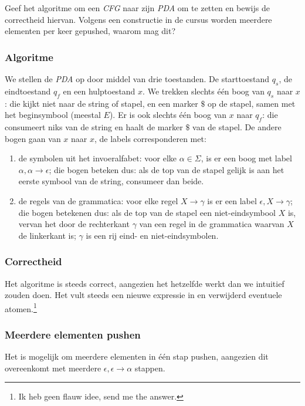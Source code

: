 \begin{question}
Geef het algoritme om een \emph{CFG} naar zijn \emph{PDA} om te zetten en bewijs de correctheid hiervan.
Volgens een constructie in de cursus worden meerdere elementen per keer gepushed, waarom mag dit?
\end{question}

\subsubsection*{Algoritme}

We stellen de \emph{PDA} op door middel van drie toestanden. De starttoestand $q_s$, de eindtoestand $q_f$ en een hulptoestand $x$. We trekken slechts \'e\'en boog van $q_s$ naar $x$: die kijkt niet naar de string of stapel, en een marker $\$$ op de stapel, samen met het beginsymbool (meestal $E$). Er is ook slechts \'e\'en boog van $x$ naar $q_f$: die consumeert niks van de string en haalt de marker $\$$ van de stapel. De andere bogen gaan van $x$ naar $x$, de labels corresponderen met:
\begin{enumerate}
	\item de symbolen uit het invoeralfabet: voor elke $\alpha \in \Sigma$, is er een boog met label $\alpha, \alpha \rightarrow \epsilon$; die bogen beteken dus: als de top van de stapel gelijk is aan het eerste symbool van de string, consumeer dan beide.
	\item de regels van de grammatica: voor elke regel $X \rightarrow \gamma$ is er een label $\epsilon,X \rightarrow \gamma$; die bogen betekenen dus: als de top van de stapel een niet-eindsymbool $X$ is, vervan het door de rechterkant $\gamma$ van een regel in de grammatica waarvan $X$ de linkerkant is; $\gamma$ is een rij eind- en niet-eindsymbolen.
\end{enumerate}

\subsubsection*{Correctheid}

Het algoritme is steeds correct, aangezien het hetzelfde werkt dan we intuitief zouden doen. Het vult steeds een nieuwe expressie in en verwijderd eventuele atomen.\footnote{Ik heb geen flauw idee, send me the answer.}

\subsubsection*{Meerdere elementen pushen}

Het is mogelijk om meerdere elementen in \'e\'en stap pushen, aangezien dit overeenkomt met meerdere $\epsilon, \epsilon \rightarrow \alpha$ stappen.
